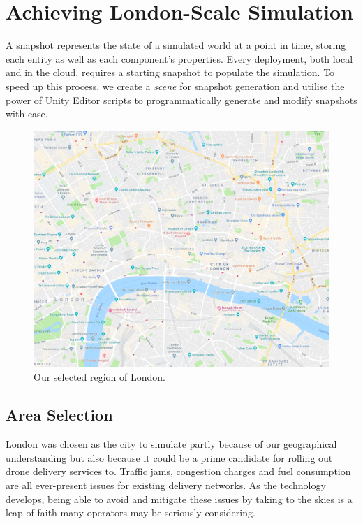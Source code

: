 \documentclass[a4paper,11pt,titlepage]{report}
\begin{document}
\chapter{Achieving London-Scale Simulation}
A snapshot represents the state of a simulated world at a point in time, storing each entity as well as each component's properties. Every deployment, both local and in the cloud, requires a starting snapshot to populate the simulation. To speed up this process, we create a \textit{scene} for snapshot generation and utilise the power of Unity Editor scripts to programmatically generate and modify snapshots with ease.

\begin{figure}[!hbpt]
  \center
  \includegraphics[width=0.9\linewidth]{img/london_snapshot_small.png}
  \caption{Our selected region of London. \cite{Google2018a}}
  \label{fig:london_snapshot_small}
\end{figure}

\section{Area Selection}
London was chosen as the city to simulate partly because of our geographical understanding but also because it could be a prime candidate for rolling out drone delivery services to. Traffic jams, congestion charges and fuel consumption are all ever-present issues for existing delivery networks. As the technology develops, being able to avoid and mitigate these issues by taking to the skies is a leap of faith many operators may be seriously considering.\\
\end{document}
